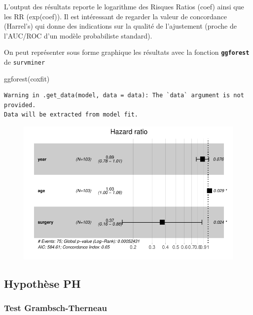 \documentclass[
  12pt,
  letterpaper,
  DIV=11,
  numbers=noendperiod,
  onepage,
  openany]{scrreprt}
\newenvironment{Shaded}{\begin{snugshade}}{\end{snugshade}}
\newcommand{\FunctionTok}[1]{\textcolor[rgb]{0.94,0.94,0.56}{#1}}
\newcommand{\NormalTok}[1]{\textcolor[rgb]{0.80,0.80,0.80}{#1}}
\begin{document}
L'output des résultats reporte le logarithme des Risques Ratios (coef)
ainsi que les RR (exp(coef)). Il est intéressant de regarder la valeur
de concordance (Harrel's) qui donne des indications sur la qualité de
l'ajustement (proche de l'AUC/ROC d'un modèle probabiliste standard).

On peut représenter sous forme graphique les résultats avec la fonction
\textbf{\texttt{ggforest}} de \texttt{survminer}

\begin{Shaded}
\begin{Highlighting}[]
\FunctionTok{ggforest}\NormalTok{(coxfit)}
\end{Highlighting}
\end{Shaded}

\begin{verbatim}
Warning in .get_data(model, data = data): The `data` argument is not provided.
Data will be extracted from model fit.
\end{verbatim}

\begin{figure}[H]

{\centering \includegraphics{14-R_files/figure-pdf/unnamed-chunk-16-1.pdf}

}

\end{figure}

\hypertarget{hypothuxe8se-ph}{%
\subsection{Hypothèse PH}\label{hypothuxe8se-ph}}

\hypertarget{test-grambsch-therneau}{%
\subsubsection{Test Grambsch-Therneau}\label{test-grambsch-therneau}}
\end{document}
